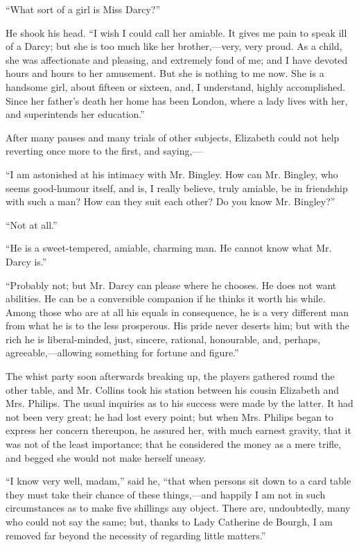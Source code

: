 \documentclass[12pt,openright]{book}
\begin{document}
“What sort of a girl is Miss Darcy?”

He shook his head. “I wish I could call her amiable. It gives me pain to speak ill of a Darcy; but she is too much like her brother,—very, very proud. As a child, she was affectionate and pleasing, and extremely fond of me; and I have devoted hours and hours to her amusement. But she is nothing to me now. She is a handsome girl, about fifteen or sixteen, and, I understand, highly accomplished. Since her father’s death her home has been London, where a lady lives with her, and superintends her education.”

After many pauses and many trials of other subjects, Elizabeth could not help reverting once more to the first, and saying,—

“I am astonished at his intimacy with Mr. Bingley. How can Mr. Bingley, who seems good-humour itself, and is, I really believe, truly amiable, be in friendship with such a man? How can they suit each other? Do you know Mr. Bingley?”

“Not at all.”

“He is a sweet-tempered, amiable, charming man. He cannot know what Mr. Darcy is.”

“Probably not; but Mr. Darcy can please where he chooses. He does not want abilities. He can be a conversible companion if he thinks it worth his while. Among those who are at all his equals in consequence, he is a very different man from what he is to the less prosperous. His pride never deserts him; but with the rich he is liberal-minded, just, sincere, rational, honourable, and, perhaps, agreeable,—allowing something for fortune and figure.”

The whist party soon afterwards breaking up, the players gathered round the other table, and Mr. Collins took his station between his cousin Elizabeth and Mrs. Philips. The usual inquiries as to his success were made by the latter. It had not been very great; he had lost every point; but when Mrs. Philips began to express her concern thereupon, he assured her, with much earnest gravity, that it was not of the least importance; that he considered the money as a mere trifle, and begged she would not make herself uneasy.

“I know very well, madam,” said he, “that when persons sit down to a card table they must take their chance of these things,—and happily I am not in such circumstances as to make five shillings any object. There are, undoubtedly, many who could not say the same; but, thanks to Lady Catherine de Bourgh, I am removed far beyond the necessity of regarding little matters.”
\end{document}

